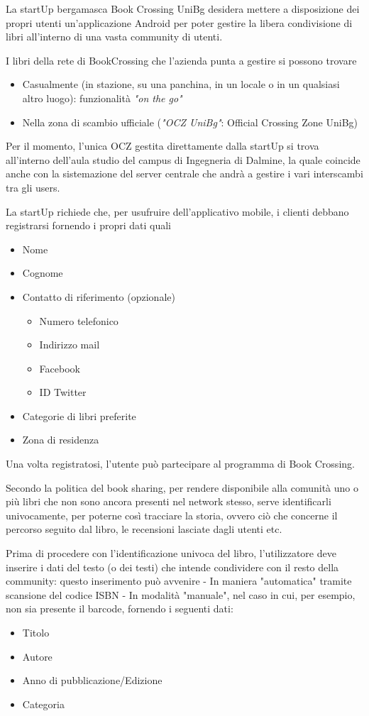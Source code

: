 La startUp bergamasca Book Crossing UniBg desidera mettere a disposizione dei propri
utenti un'applicazione Android per poter gestire la libera condivisione di libri all'interno di una vasta community di utenti.

I libri della rete di BookCrossing che l'azienda punta a gestire si possono trovare
\begin{itemize}
	\item Casualmente (in stazione, su una panchina, in un locale o in un qualsiasi altro luogo): funzionalità \textit{"on the go"}
	\item Nella zona di scambio ufficiale (\textit{"OCZ UniBg"}: Official Crossing Zone UniBg)
\end{itemize}

Per il momento, l'unica OCZ gestita direttamente dalla startUp si trova all'interno dell'aula studio del campus di Ingegneria di Dalmine, la quale coincide anche con la sistemazione del server centrale che andrà a gestire i vari interscambi tra gli users.

La startUp richiede che, per usufruire dell'applicativo mobile, i clienti debbano registrarsi fornendo i propri dati quali
\begin{itemize}
	\item Nome
	\item Cognome
	\item Contatto di riferimento (opzionale)
	\begin{itemize}
		\item Numero telefonico
		\item Indirizzo mail
		\item Facebook
		\item ID Twitter
	\end{itemize}
	\item Categorie di libri preferite
	\item Zona di residenza
\end{itemize}

Una volta registratosi, l'utente può partecipare al programma di Book Crossing.

Secondo la politica del book sharing, per rendere disponibile alla comunità 
uno o più libri che non sono ancora presenti nel network stesso, 
serve
identificarli univocamente, per poterne così tracciare la storia, ovvero ciò 
che concerne il percorso seguito dal libro, le recensioni lasciate dagli utenti etc.

Prima di procedere con l'identificazione univoca del libro, l'utilizzatore deve inserire i dati 
del testo (o dei testi) che intende condividere con il resto della community: questo inserimento può avvenire
- In maniera "automatica" tramite scansione del codice ISBN
- In modalità "manuale", nel caso in cui, per esempio, non sia presente il barcode, fornendo i 
seguenti dati:
\begin{itemize}
	\item Titolo
	\item Autore
	\item Anno di pubblicazione/Edizione
	\item Categoria
\end{itemize}

